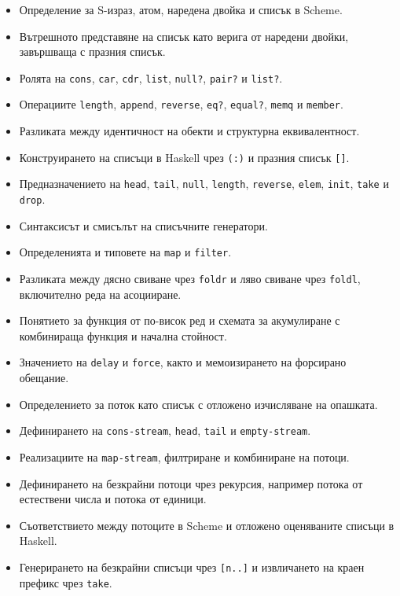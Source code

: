 \begin{itemize}
\item Определение за S-израз, атом, наредена двойка и списък в Scheme.
\item Вътрешното представяне на списък като верига от наредени двойки, завършваща с празния списък.
\item Ролята на \texttt{cons}, \texttt{car}, \texttt{cdr}, \texttt{list}, \texttt{null?}, \texttt{pair?} и \texttt{list?}.
\item Операциите \texttt{length}, \texttt{append}, \texttt{reverse}, \texttt{eq?}, \texttt{equal?}, \texttt{memq} и \texttt{member}.
\item Разликата между идентичност на обекти и структурна еквивалентност.
\item Конструирането на списъци в Haskell чрез \texttt{(:)} и празния списък \texttt{[]}.
\item Предназначението на \texttt{head}, \texttt{tail}, \texttt{null}, \texttt{length}, \texttt{reverse}, \texttt{elem}, \texttt{init}, \texttt{take} и \texttt{drop}.
\item Синтаксисът и смисълът на списъчните генератори.
\item Определенията и типовете на \texttt{map} и \texttt{filter}.
\item Разликата между дясно свиване чрез \texttt{foldr} и ляво свиване чрез \texttt{foldl}, включително реда на асоцииране.
\item Понятието за функция от по-висок ред и схемата за акумулиране с комбинираща функция и начална стойност.
\item Значението на \texttt{delay} и \texttt{force}, както и мемоизирането на форсирано обещание.
\item Определението за поток като списък с отложено изчисляване на опашката.
\item Дефинирането на \texttt{cons-stream}, \texttt{head}, \texttt{tail} и \texttt{empty-stream}.
\item Реализациите на \texttt{map-stream}, филтриране и комбиниране на потоци.
\item Дефинирането на безкрайни потоци чрез рекурсия, например потока от естествени числа и потока от единици.
\item Съответствието между потоците в Scheme и отложено оценяваните списъци в Haskell.
\item Генерирането на безкрайни списъци чрез \texttt{[n..]} и извличането на краен префикс чрез \texttt{take}.
\end{itemize}
